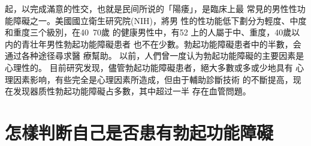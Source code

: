 \documentclass[12pt,UTF8]{ctexbook}
\begin{document}
起，以完成滿意的性交，也就是民间所说的「陽痿」，是臨床上最
常見的男性性功能障礙之一。美國國立衛生研究院(NIH)，將男
性的性功能低下劃分为輕度、中度和重度三个級別，在40~70歲
的健康男性中，有52%
上的人屬于中、重度，40歲以内的青壮年男性勃起功能障礙患者
也不在少數。勃起功能障礙患者中的半數，会通过各种途径尋求醫
療幫助。
以前，人們曾一度认为勃起功能障礙的主要因素是心理性的。
目前研究发现，儘管勃起功能障礙患者，絕大多數或多或少地具有
心理因素影响，有些完全是心理因素所造成，但由于輔助診斷技術
的不斷提高，现在发现器质性勃起功能障礙占多數，其中超过一半
存在血管問題。

\section{怎樣判断自己是否患有勃起功能障礙}
\end{document}
